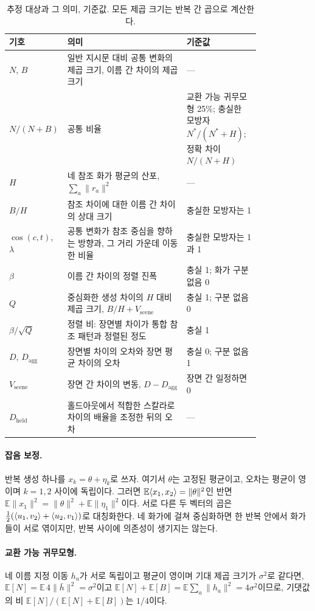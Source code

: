 \begin{table}[ht]
\caption{추정 대상과 그 의미, 기준값. 모든 제곱 크기는 반복 간 곱으로 계산한다.}
\label{tab:estimands}
\vspace{2pt}
\centering\small
\begin{tabular}{@{}lp{0.52\linewidth}p{0.3\linewidth}@{}}
\toprule
기호 & 의미 & 기준값\\
\midrule
$N$, $B$ & 일반 지시문 대비 공통 변화의 제곱 크기, 이름 간 차이의 제곱 크기 & ---\\
$N/(N+B)$ & 공통 비율 & 교환 가능 귀무모형 25\%; 충실한 모방자 $N^*/(N^*+H)$; 정확 차이
$N/(N+H)$\\
$H$ & 네 참조 화가 평균의 산포, $\sum_a\|r_a\|^2$ & ---\\
$B/H$ & 참조 차이에 대한 이름 간 차이의 상대 크기 & 충실한 모방자는 1\\
$\cos(c,t)$, $\lambda$ & 공통 변화가 참조 중심을 향하는 방향과, 그 거리 가운데 이동한 비율 & 충실한
모방자는 1과 1\\
$\beta$ & 이름 간 차이의 정렬 진폭 & 충실 1; 화가 구분 없음 0\\
$Q$ & 중심화한 생성 차이의 $H$ 대비 제곱 크기, $B/H+V_{\mathrm{scene}}$ & 충실 1; 구분 없음 0\\
$\beta/\sqrt{Q}$ & 정렬 비: 장면별 차이가 통합 참조 패턴과 정렬된 정도 & 충실 1\\
$D$, $D_{\mathrm{agg}}$ & 장면별 차이의 오차와 장면 평균 차이의 오차 & 충실 0; 구분 없음 1\\
$V_{\mathrm{scene}}$ & 장면 간 차이의 변동, $D-D_{\mathrm{agg}}$ & 장면 간 일정하면 0\\
$D_{\mathrm{held}}$ & 홀드아웃에서 적합한 스칼라로 차이의 배율을 조정한 뒤의 오차 & ---\\
\bottomrule
\end{tabular}
\end{table}

\paragraph{잡음 보정.} 반복 생성 하나를 $x_k=\theta+\eta_k$로 쓰자. 여기서 $\theta$는 고정된 평균이고,
오차는 평균이 영이며 $k=1,2$ 사이에 독립이다. 그러면 $\mathbb E\langle x_1,x_2\rangle=\|\theta\|^2$인 반면
$\mathbb E\|x_1\|^2=\|\theta\|^2+\mathbb E\|\eta_1\|^2$이다. 서로 다른 두 벡터의 곱은
$\frac12(\langle u_1,v_2\rangle+\langle u_2,v_1\rangle)$로 대칭화한다. 네 화가에 걸쳐 중심화하면 한 반복 안에서 화가들이
서로 엮이지만, 반복 사이에 의존성이 생기지는 않는다.

\paragraph{교환 가능 귀무모형.} 네 이름 지정 이동 $h_a$가 서로 독립이고 평균이 영이며 기대 제곱 크기가
$\sigma^2$로 같다면, $\mathbb E[N]=\mathbb E\,4\|\bar h\|^2=\sigma^2$이고
$\mathbb E[N]+\mathbb E[B]=\mathbb E\sum_a\|h_a\|^2=4\sigma^2$이므로, 기댓값의 비
$\mathbb E[N]/(\mathbb E[N]+\mathbb E[B])$는 $1/4$이다.

